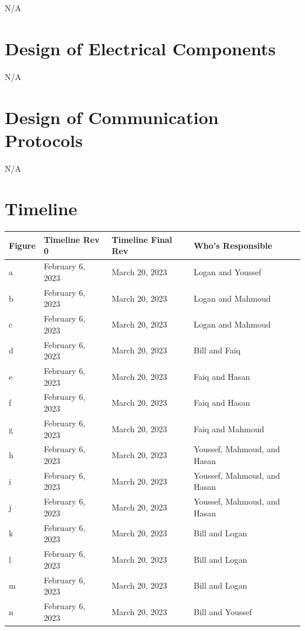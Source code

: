 \documentclass[12pt, titlepage]{article}
\begin{document}
	N/A
	
	\section{Design of Electrical Components}
	
	N/A
	
	\section{Design of Communication Protocols}
	
	N/A
	
	\section{Timeline}
	
	\begin{table}[H]
\begin{tabular}{|l|l|l|l|}
\hline
Figure & Timeline Rev 0   & Timeline Final Rev & Who's Responsible           \\ \hline
a      & February 6, 2023 & March 20, 2023     & Logan and Youssef           \\ \hline
b      & February 6, 2023 & March 20, 2023     & Logan and Mahmoud           \\ \hline
c      & February 6, 2023 & March 20, 2023     & Logan and Mahmoud           \\ \hline
d      & February 6, 2023 & March 20, 2023     & Bill and Faiq               \\ \hline
e      & February 6, 2023 & March 20, 2023     & Faiq and Hasan              \\ \hline
f      & February 6, 2023 & March 20, 2023     & Faiq and Hasan              \\ \hline
g      & February 6, 2023 & March 20, 2023     & Faiq and Mahmoud            \\ \hline
h      & February 6, 2023 & March 20, 2023     & Youssef, Mahmoud, and Hasan \\ \hline
i      & February 6, 2023 & March 20, 2023     & Youssef, Mahmoud, and Hasan \\ \hline
j      & February 6, 2023 & March 20, 2023     & Youssef, Mahmoud, and Hasan \\ \hline
k      & February 6, 2023 & March 20, 2023     & Bill and Logan              \\ \hline
l      & February 6, 2023 & March 20, 2023     & Bill and Logan              \\ \hline
m      & February 6, 2023 & March 20, 2023     & Bill and Logan              \\ \hline
n      & February 6, 2023 & March 20, 2023     & Bill and Youssef            \\ \hline
\end{tabular}
\end{table}
	
\end{document}
